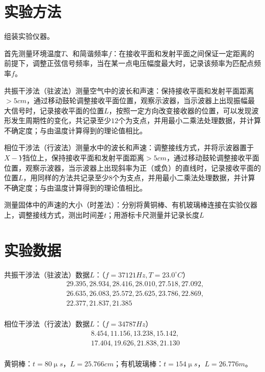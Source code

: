 \documentclass[a4paper]{ltxdoc}
\begin{document}
\begin{multicols}{2}
    \section{实验方法}

    组装实验仪器。

    首先测量环境温度$T$、和简谐频率$f$：在接收平面和发射平面之间保证一定距离的前提下，调整正弦信号频率，当在某一点电压幅度最大时，记录该频率为匹配点频率$f$。

    共振干涉法（驻波法）测量空气中的波长和声速：保持接收平面和发射平面距离$>5cm$，通过移动鼓轮调整接收平面位置，观察示波器，当示波器上出现振幅最大信号时，记录接收平面的位置$L$，按照一定方向改变接收器的位置，可以发现波形发生周期性的变化，共记录至少$12$个为支点，并用最小二乘法处理数据，并计算不确定度；与由温度计算得到的理论值相比。

    相位干涉法（行波法）测量水中的波长和声速：调整接线方式，并将示波器置于$X-Y$挡位上，保持接收平面和发射平面距离$>5cm$，通过移动鼓轮调整接收平面位置，观察示波器，当示波器上出现斜率为正（或负）的直线时，记录接收平面的位置$L$，用同样的方法共记录至少$8$个为支点，并用最小二乘法处理数据，并计算不确定度；与由温度计算得到的理论值相比。

    测量固体中的声速的大小（时差法）：分别将黄铜棒、有机玻璃棒连接在实验仪器上，调整接线方式，测出时间差$t$；用游标卡尺测量并记录长度$L$

    \section{实验数据}

    共振干涉法（驻波法）数据$L$：（$f = 37121 Hz,T= 23.0^{\circ}C$）
    $$
        \begin{aligned}
             & 29.395,28.934,28.416,28.010, 27.518,27.092, \\&26.635,26.083,25.572,25.625,23.786,22.869,\\&22.377,21.837,21.385\\
        \end{aligned}
    $$

    \bigskip
    相位干涉法（行波法）数据$L$：（$f = 34787 Hz$）
    $$
        \begin{aligned}
             & 8.454,11.156,13.238,15.142, \\&17.404,19.626,21.838,21.130\\
        \end{aligned}
    $$

    \bigskip
    黄铜棒：$t=80\upmu s$，$L=25.766 cm$；有机玻璃棒：$t=154\upmu s$，$L=26.776m$。


\end{multicols}
\end{document}
